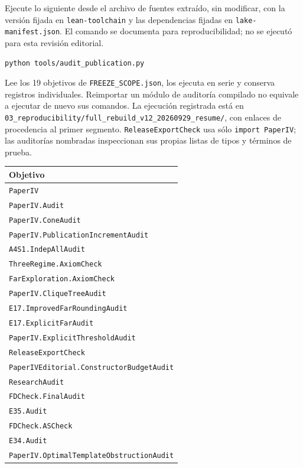 \documentclass[spanish,11pt,a4paper]{article}
\newcounter{none}
\begin{document}
Ejecute lo siguiente desde el archivo de fuentes extraído, sin
modificar, con la versión fijada en \nolinkurl{lean-toolchain} y las
dependencias fijadas en \nolinkurl{lake-manifest.json}. El comando se
documenta para reproducibilidad; no se ejecutó para esta revisión
editorial.

\begin{verbatim}
python tools/audit_publication.py
\end{verbatim}

Lee los 19 objetivos de \nolinkurl{FREEZE_SCOPE.json}, los ejecuta en
serie y conserva registros individuales. Reimportar un módulo de
auditoría compilado no equivale a ejecutar de nuevo sus comandos. La
ejecución registrada está en
\nolinkurl{03_reproducibility/full_rebuild_v12_20260929_resume/}, con
enlaces de procedencia al primer segmento. \nolinkurl{ReleaseExportCheck}
usa sólo \texttt{import\ PaperIV}; las auditorías nombradas inspeccionan
sus propias listas de tipos y términos de prueba.

{\def\LTcaptype{none} %
\begin{longtable}[]{@{}l@{}}
\toprule\noalign{}
Objetivo \\
\midrule\noalign{}
\endhead
\bottomrule\noalign{}
\endlastfoot
\nolinkurl{PaperIV} \\
\nolinkurl{PaperIV.Audit} \\
\nolinkurl{PaperIV.ConeAudit} \\
\nolinkurl{PaperIV.PublicationIncrementAudit} \\
\nolinkurl{A4S1.IndepAllAudit} \\
\nolinkurl{ThreeRegime.AxiomCheck} \\
\nolinkurl{FarExploration.AxiomCheck} \\
\nolinkurl{PaperIV.CliqueTreeAudit} \\
\nolinkurl{E17.ImprovedFarRoundingAudit} \\
\nolinkurl{E17.ExplicitFarAudit} \\
\nolinkurl{PaperIV.ExplicitThresholdAudit} \\
\nolinkurl{ReleaseExportCheck} \\
\nolinkurl{PaperIVEditorial.ConstructorBudgetAudit} \\
\nolinkurl{ResearchAudit} \\
\nolinkurl{FDCheck.FinalAudit} \\
\nolinkurl{E35.Audit} \\
\nolinkurl{FDCheck.ASCheck} \\
\nolinkurl{E34.Audit} \\
\nolinkurl{PaperIV.OptimalTemplateObstructionAudit} \\
\end{longtable}
}
\end{document}
